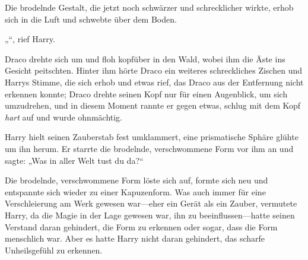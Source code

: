 \begin{em}
Die brodelnde Gestalt, die jetzt noch schwärzer und schrecklicher wirkte, erhob sich in die Luft und schwebte über dem Boden.

„“, rief Harry.

Draco drehte sich um und floh kopfüber in den Wald, wobei ihm die Äste ins Gesicht peitschten. Hinter ihm hörte Draco ein weiteres schreckliches Zischen und Harrys Stimme, die sich erhob und etwas rief, das Draco aus der Entfernung nicht erkennen konnte; Draco drehte seinen Kopf nur für einen Augenblick, um sich umzudrehen, und in diesem Moment rannte er gegen etwas, schlug mit dem Kopf \emph{hart} auf und wurde ohnmächtig.
\end{em}

\later

Harry hielt seinen Zauberstab fest umklammert, eine prismatische Sphäre glühte um ihn herum. Er starrte die brodelnde, verschwommene Form vor ihm an und sagte: „Was in aller Welt tust du da?“

Die brodelnde, verschwommene Form löste sich auf, formte sich neu und entspannte sich wieder zu einer Kapuzenform. Was auch immer für eine Verschleierung am Werk gewesen war—eher ein Gerät als ein Zauber, vermutete Harry, da die Magie in der Lage gewesen war, ihn zu beeinflussen—hatte seinen Verstand daran gehindert, die Form zu erkennen oder sogar, dass die Form menschlich war. Aber es hatte Harry nicht daran gehindert, das scharfe Unheilsgefühl zu erkennen.

